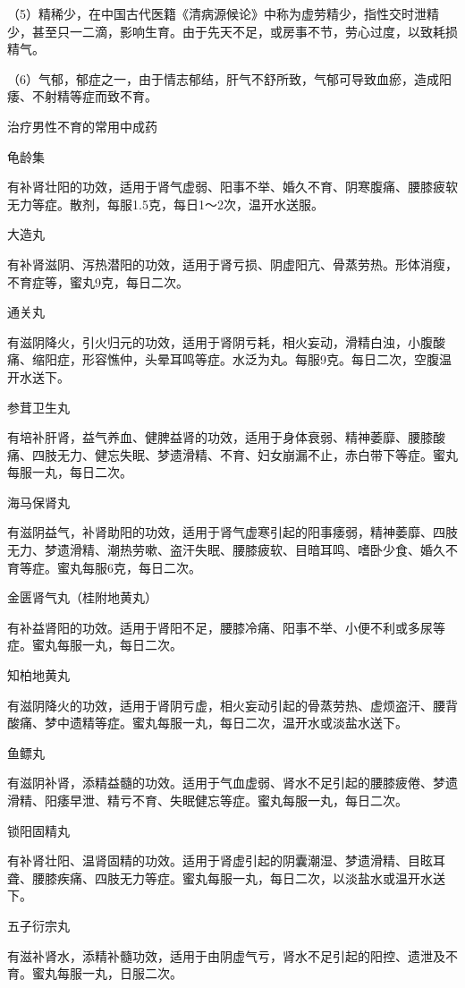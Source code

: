 \documentclass[12pt,UTF8]{ctexbook}
\begin{document}
（5）精稀少，在中国古代医籍《清病源候论》中称为虚劳精少，指性交时泄精少，甚至只一二滴，影响生育。由于先天不足，或房事不节，劳心过度，以致耗损精气。

（6）气郁，郁症之一，由于情志郁结，肝气不舒所致，气郁可导致血瘀，造成阳痿、不射精等症而致不育。





治疗男性不育的常用中成药


龟龄集

有补肾壮阳的功效，适用于肾气虚弱、阳事不举、婚久不育、阴寒腹痛、腰膝疲软无力等症。散剂，每服1.5克，每日1～2次，温开水送服。

大造丸

有补肾滋阴、泻热潜阳的功效，适用于肾亏损、阴虚阳亢、骨蒸劳热。形体消瘦，不育症等，蜜丸9克，每日二次。

通关丸

有滋阴降火，引火归元的功效，适用于肾阴亏耗，相火妄动，滑精白浊，小腹酸痛、缩阳症，形容憔仲，头晕耳鸣等症。水泛为丸。每服9克。每日二次，空腹温开水送下。

参茸卫生丸

有培补肝肾，益气养血、健脾益肾的功效，适用于身体衰弱、精神萎靡、腰膝酸痛、四肢无力、健忘失眠、梦遗滑精、不育、妇女崩漏不止，赤白带下等症。蜜丸每服一丸，每日二次。

海马保肾丸

有滋阴益气，补肾助阳的功效，适用于肾气虚寒引起的阳事痿弱，精神萎靡、四肢无力、梦遗滑精、潮热劳嗽、盗汗失眠、腰膝疲软、目暗耳鸣、嗜卧少食、婚久不育等症。蜜丸每服6克，每日二次。

金匮肾气丸（桂附地黄丸）

有补益肾阳的功效。适用于肾阳不足，腰膝冷痛、阳事不举、小便不利或多尿等症。蜜丸每服一丸，每日二次。

知柏地黄丸

有滋阴降火的功效，适用于肾阴亏虚，相火妄动引起的骨蒸劳热、虚烦盗汗、腰背酸痛、梦中遗精等症。蜜丸每服一丸，每日二次，温开水或淡盐水送下。

鱼鳔丸

有滋阴补肾，添精益髓的功效。适用于气血虚弱、肾水不足引起的腰膝疲倦、梦遗滑精、阳痿早泄、精亏不育、失眠健忘等症。蜜丸每服一丸，每日二次。

锁阳固精丸

有补肾壮阳、温肾固精的功效。适用于肾虚引起的阴囊潮湿、梦遗滑精、目眩耳聋、腰膝疾痛、四肢无力等症。蜜丸每服一丸，每日二次，以淡盐水或温开水送下。

五子衍宗丸

有滋补肾水，添精补髓功效，适用于由阴虚气亏，肾水不足引起的阳控、遗泄及不育。蜜丸每服一丸，日服二次。
\end{document}
